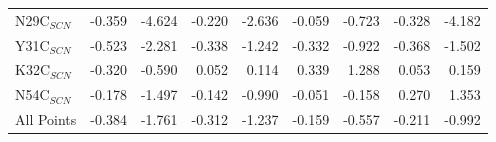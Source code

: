 \documentclass[landscape]{article}
\begin{document}
{\begin{tabular}{ l || r r | r r | r r | r r}
N29C$_{SCN}$   & -0.359         & -4.624         & -0.220         & -2.636         & -0.059         & -0.723         & -0.328         & -4.182        \\
Y31C$_{SCN}$   & -0.523         & -2.281         & -0.338         & -1.242         & -0.332         & -0.922         & -0.368         & -1.502        \\
K32C$_{SCN}$   & -0.320         & -0.590         & 0.052          & 0.114          & 0.339          & 1.288          & 0.053          & 0.159         \\
N54C$_{SCN}$   & -0.178         & -1.497         & -0.142         & -0.990         & -0.051         & -0.158         & 0.270          & 1.353         \\
\hline
All Points     & -0.384         & -1.761         & -0.312         & -1.237         & -0.159         & -0.557         & -0.211         & -0.992        \\
\end{tabular}\\
}\\
\end{document}
